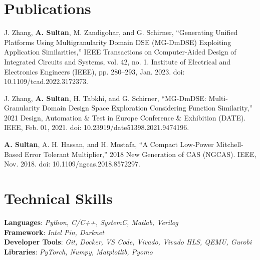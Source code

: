 \documentclass[letterpaper,11pt]{article}
\makeatletter
\newcommand{\resumeItem}[1]{
  \item\small{
    {#1 \vspace{-2pt}}
  }
}
\newcommand{\resumeProjectHeading}[2]{
    \item
    \begin{tabular*}{0.97\textwidth}{l@{\extracolsep{\fill}}r}
      \small#1 & #2 \\
    \end{tabular*}\vspace{-7pt}
}
\newcommand{\resumeSubHeadingListStart}{\begin{itemize}[leftmargin=0.15in, label={}]}
\newcommand{\resumeSubHeadingListEnd}{\end{itemize}}
\newcommand{\resumeItemListStart}{\begin{itemize}}
\newcommand{\resumeItemListEnd}{\end{itemize}\vspace{-5pt}}
\makeatother
\begin{document}
%
\section{Publications}
\begin{itemize}[leftmargin=0.15in, label={}]
  \small{\item{J. Zhang, \textbf{A. Sultan}, M. Zandigohar, and G. Schirner, “Generating Unified Platforms Using Multigranularity Domain DSE (MG-DmDSE) Exploiting Application Similarities,” IEEE Transactions on Computer-Aided Design of Integrated Circuits and Systems, vol. 42, no. 1. Institute of Electrical and Electronics Engineers (IEEE), pp. 280–293, Jan. 2023. doi: 10.1109/tcad.2022.3172373.}}
  \small{\item{J. Zhang, \textbf{A. Sultan}, H. Tabkhi, and G. Schirner, “MG-DmDSE: Multi-Granularity Domain Design Space Exploration Considering Function Similarity,” 2021 Design, Automation \& Test in Europe Conference \& Exhibition (DATE). IEEE, Feb. 01, 2021. doi: 10.23919/date51398.2021.9474196.}}
  \small{\item{\textbf{A. Sultan}, A. H. Hassan, and H. Mostafa, “A Compact Low-Power Mitchell-Based Error Tolerant Multiplier,” 2018 New Generation of CAS (NGCAS). IEEE, Nov. 2018. doi: 10.1109/ngcas.2018.8572297.}}
\end{itemize}


%
\section{Technical Skills}
 \begin{itemize}[leftmargin=0.15in, label={}]
    \small{\item{
     \textbf{Languages}{: \emph{Python, C/C++, SystemC, Matlab, Verilog}} \\
     \textbf{Framework}{: \emph{Intel Pin, Darknet}} \\
     \textbf{Developer Tools}{: \emph{Git, Docker, VS Code, Vivado, Vivado HLS, QEMU, Gurobi}} \\
     \textbf{Libraries}{: \emph{PyTorch, Numpy, Matplotlib, Pyomo}}
    }}
 \end{itemize}

\end{document}
